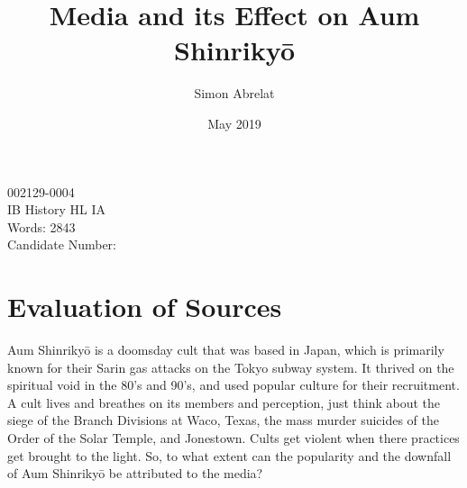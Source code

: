 \documentclass[12pt, letterpaper]{article}
\title{Media and its Effect on Aum Shinriky\=o}
\author{Simon Abrelat}
\date{May 2019}
\newcommand{\poses}[1]{#1's}
\begin{document}
\doublespace{}
\parindent=0.5in

{\fontsize{12}{14.4}
  {\singlespace
    \maketitle
    \begin{center}
    002129-0004 \\
    \vspace{4mm}
    IB History HL IA \\
    \vspace{4mm}
    Words: 2843 \\ %
    \vspace{4mm}
    Candidate Number: \\
    \end{center}
  }
}	


\newpage
\tableofcontents
{}
\newpage

\section{Evaluation of Sources}
Aum Shinriky\=o is a doomsday cult that was based in Japan, which is primarily known for their Sarin gas
attacks on the Tokyo subway system. It thrived on the spiritual void in the \poses{80} and  \poses{90},
and used popular culture for their recruitment. A cult lives and breathes on its members and perception,
just think about the siege of the Branch Divisions at Waco, Texas, the mass murder suicides of the Order of
the Solar Temple, and Jonestown. Cults get violent when there practices get brought to the light. So, to
what extent can the popularity and the downfall of Aum Shinriky\=o be attributed to the media?
\end{document}
